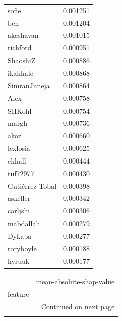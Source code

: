 \documentclass[9pt,lineno]{elife}
\begin{document}
\begin{appendixbox}
\begin{longtable}{lr}
sofie                      &                  0.001251 \\
ben                        &                  0.001204 \\
akeshavan                  &                  0.001015 \\
richford                   &                  0.000951 \\
ShaoshiZ                   &                  0.000886 \\
ikahhale                   &                  0.000868 \\
SimranJuneja               &                  0.000864 \\
Alex                       &                  0.000758 \\
SHKohl                     &                  0.000754 \\
margh                      &                  0.000736 \\
akoz                       &                  0.000660 \\
lexlosia                   &                  0.000625 \\
ehhall                     &                  0.000444 \\
tuf72977                   &                  0.000430 \\
Gutiérrez-Tobal            &                  0.000398 \\
askeller                   &                  0.000342 \\
carljshi                   &                  0.000306 \\
mabdallah                  &                  0.000279 \\
Dykaba                     &                  0.000277 \\
roryboyle                  &                  0.000188 \\
hyruuk                     &                  0.000177 \\
\end{longtable}

\begin{longtable}{lr}
\toprule
{} &  mean-absolute-shap-value \\
feature               &                           \\
\midrule
\endhead
\midrule
\multicolumn{2}{r}{{Continued on next page}} \\
\midrule
\endfoot


\end{longtable}
\end{appendixbox}
\end{document}
